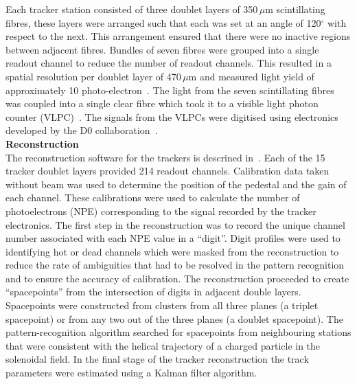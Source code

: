 Each tracker station consisted of three doublet layers of 350\,$\mu$m
scintillating fibres, these layers were arranged such that each was
set at an angle of 120$^\circ$ with respect to the next.
This arrangement ensured that there were no inactive regions between
adjacent fibres.
Bundles of seven fibres were grouped into a single readout channel to
reduce the number of readout channels.
This resulted in a spatial resolution per doublet layer of 470\,$\mu$m
and measured light yield of approximately 10
photo-electron~\cite{Ellis:2010bb}.
The light from the seven scintillating fibres was coupled into a
single clear fibre which took it to a visible light photon counter
(VLPC)~\cite{VLPC}.
The signals from the VLPCs were digitised using electronics developed
by the D0 collaboration~\cite{Abazov:2005pn}. \\

\noindent\textbf{Reconstruction} \\
\noindent
The reconstruction software for the trackers is descrined
in~\cite{Dobbs:2016ejn}.
Each of the 15 tracker doublet layers provided 214 readout channels.
Calibration data taken without beam was used to determine the position
of the pedestal and the gain of each channel.
These calibrations were used to calculate the number of photoelectrons
(NPE) corresponding to the signal recorded by the tracker
electronics.
The first step in the reconstruction was to record the unique channel
number associated with each NPE value in a ``digit''.
Digit profiles were used to identifying hot or dead channels which
were masked from the reconstruction to reduce the rate of ambiguities
that had to be resolved in the pattern recognition and to ensure the
accuracy of calibration.
The reconstruction proceeded to create ``spacepoints'' from the
intersection of digits in adjacent double layers.
Spacepoints were constructed from clusters from all three planes (a
triplet spacepoint) or from any two out of the three planes (a doublet
spacepoint).
The pattern-recognition algorithm searched for spacepoints from
neighbouring stations that were consistent with the helical trajectory
of a charged particle in the solenoidal field.
In the final stage of the tracker reconstruction the track parameters
were estimated using a Kalman filter algorithm. \\

